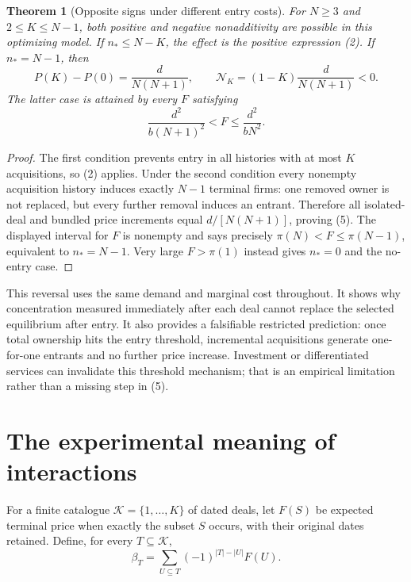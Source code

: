 \documentclass[11pt]{article}
\newtheorem{theorem}{Theorem}
\theoremstyle{remark}
\begin{document}
\begin{theorem}[Opposite signs under different entry costs]
For $N\geq3$ and $2\leq K\leq N-1$, both positive and negative nonadditivity are possible in this optimizing model. If $n_*\leq N-K$, the effect is the positive expression (2). If $n_*=N-1$, then
\[
 P(K)-P(0)=\frac{d}{N(N+1)},\qquad
 \mathcal N_K=(1-K)\frac{d}{N(N+1)}<0.                   \tag{5}
\]
The latter case is attained by every $F$ satisfying
\[
 \frac{d^2}{b(N+1)^2}<F\leq\frac{d^2}{bN^2}.
\]
\end{theorem}
\begin{proof}
The first condition prevents entry in all histories with at most $K$ acquisitions, so (2) applies. Under the second condition every nonempty acquisition history induces exactly $N-1$ terminal firms: one removed owner is not replaced, but every further removal induces an entrant. Therefore all isolated-deal and bundled price increments equal $d/[N(N+1)]$, proving (5). The displayed interval for $F$ is nonempty and says precisely $\pi(N)<F\leq\pi(N-1)$, equivalent to $n_*=N-1$. Very large $F>\pi(1)$ instead gives $n_*=0$ and the no-entry case.
\end{proof}

This reversal uses the same demand and marginal cost throughout. It shows why concentration measured immediately after each deal cannot replace the selected equilibrium after entry. It also provides a falsifiable restricted prediction: once total ownership hits the entry threshold, incremental acquisitions generate one-for-one entrants and no further price increase. Investment or differentiated services can invalidate this threshold mechanism; that is an empirical limitation rather than a missing step in (5).

\section{The experimental meaning of interactions}
For a finite catalogue $\mathcal K=\{1,\ldots,K\}$ of dated deals, let $F(S)$ be expected terminal price when exactly the subset $S$ occurs, with their original dates retained. Define, for every $T\subseteq\mathcal K$,
\[
 \beta_T=\sum_{U\subseteq T}(-1)^{|T|-|U|}F(U).
\]
\end{document}
